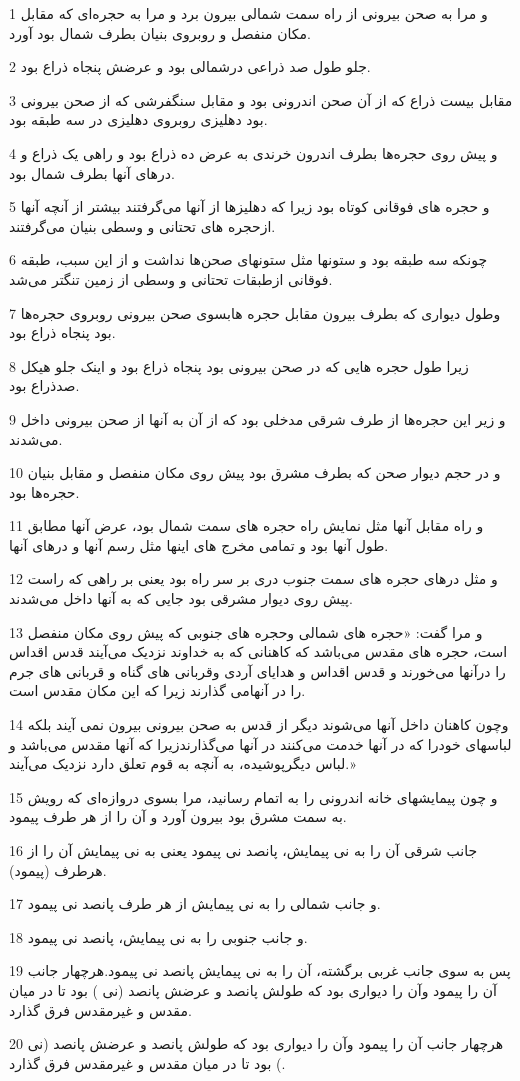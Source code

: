\par 1 و مرا به صحن بیرونی از راه سمت شمالی بیرون برد و مرا به حجره‌ای که مقابل مکان منفصل و روبروی بنیان بطرف شمال بود آورد.
\par 2 جلو طول صد ذراعی درشمالی بود و عرضش پنجاه ذراع بود.
\par 3 مقابل بیست ذراع که از آن صحن اندرونی بود و مقابل سنگفرشی که از صحن بیرونی بود دهلیزی روبروی دهلیزی در سه طبقه بود.
\par 4 و پیش روی حجره‌ها بطرف اندرون خرندی به عرض ده ذراع بود و راهی یک ذراع و درهای آنها بطرف شمال بود.
\par 5 و حجره های فوقانی کوتاه بود زیرا که دهلیزها از آنها می‌گرفتند بیشتر از آنچه آنها ازحجره های تحتانی و وسطی بنیان می‌گرفتند.
\par 6 چونکه سه طبقه بود و ستونها مثل ستونهای صحن‌ها نداشت و از این سبب، طبقه فوقانی ازطبقات تحتانی و وسطی از زمین تنگتر می‌شد.
\par 7 وطول دیواری که بطرف بیرون مقابل حجره هابسوی صحن بیرونی روبروی حجره‌ها بود پنجاه ذراع بود.
\par 8 زیرا طول حجره هایی که در صحن بیرونی بود پنجاه ذراع بود و اینک جلو هیکل صدذراع بود.
\par 9 و زیر این حجره‌ها از طرف شرقی مدخلی بود که از آن به آنها از صحن بیرونی داخل می‌شدند.
\par 10 و در حجم دیوار صحن که بطرف مشرق بود پیش روی مکان منفصل و مقابل بنیان حجره‌ها بود.
\par 11 و راه مقابل آنها مثل نمایش راه حجره های سمت شمال بود، عرض آنها مطابق طول آنها بود و تمامی مخرج های اینها مثل رسم آنها و درهای آنها.
\par 12 و مثل درهای حجره های سمت جنوب دری بر سر راه بود یعنی بر راهی که راست پیش روی دیوار مشرقی بود جایی که به آنها داخل می‌شدند.
\par 13 و مرا گفت: «حجره های شمالی وحجره های جنوبی که پیش روی مکان منفصل است، حجره های مقدس می‌باشد که کاهنانی که به خداوند نزدیک می‌آیند قدس اقداس را درآنها می‌خورند و قدس اقداس و هدایای آردی وقربانی های گناه و قربانی های جرم را در آنهامی گذارند زیرا که این مکان مقدس است.
\par 14 وچون کاهنان داخل آنها می‌شوند دیگر از قدس به صحن بیرونی بیرون نمی آیند بلکه لباسهای خودرا که در آنها خدمت می‌کنند در آنها می‌گذارندزیرا که آنها مقدس می‌باشد و لباس دیگرپوشیده، به آنچه به قوم تعلق دارد نزدیک می‌آیند.»
\par 15 و چون پیمایشهای خانه اندرونی را به اتمام رسانید، مرا بسوی دروازه‌ای که رویش به سمت مشرق بود بیرون آورد و آن را از هر طرف پیمود.
\par 16 جانب شرقی آن را به نی پیمایش، پانصد نی پیمود یعنی به نی پیمایش آن را از هرطرف (پیمود).
\par 17 و جانب شمالی را به نی پیمایش از هر طرف پانصد نی پیمود.
\par 18 و جانب جنوبی را به نی پیمایش، پانصد نی پیمود.
\par 19 پس به سوی جانب غربی برگشته، آن را به نی پیمایش پانصد نی پیمود.هر‌چهار جانب آن را پیمود وآن را دیواری بود که طولش پانصد و عرضش پانصد (نی ) بود تا در میان مقدس و غیرمقدس فرق گذارد.
\par 20 هر‌چهار جانب آن را پیمود وآن را دیواری بود که طولش پانصد و عرضش پانصد (نی ) بود تا در میان مقدس و غیرمقدس فرق گذارد.

